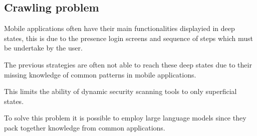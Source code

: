 \subsection{Crawling problem}\label{crawling-problem}

Mobile applications often have their main functionalities displayied in
deep states, this is due to the presence login screens and sequence of
steps which must be undertake by the user.

The previous strategies are often not able to reach these deep states
due to their missing knowledge of common patterns in mobile
applications.

This limits the ability of dynamic security scanning tools to only
superficial states.

To solve this problem it is possible to employ large language models
since they pack together knowledge from common applications.
